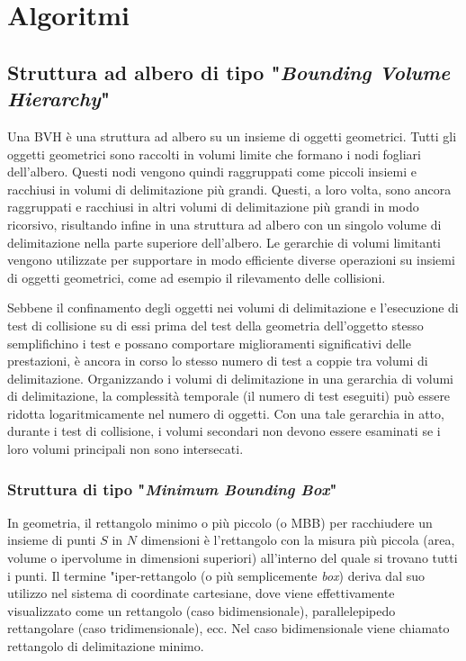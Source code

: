 \chapter{Algoritmi}
\label{Geom_Algos}
%
\section{Struttura ad albero di tipo "\textit{Bounding Volume Hierarchy}"}
%
Una \ac{BVH} è una struttura ad albero su un insieme di oggetti geometrici. Tutti gli oggetti geometrici sono raccolti in volumi limite che formano i nodi fogliari dell'albero. Questi nodi vengono quindi raggruppati come piccoli insiemi e racchiusi in volumi di delimitazione più grandi. Questi, a loro volta, sono ancora raggruppati e racchiusi in altri volumi di delimitazione più grandi in modo ricorsivo, risultando infine in una struttura ad albero con un singolo volume di delimitazione nella parte superiore dell'albero. Le gerarchie di volumi limitanti vengono utilizzate per supportare in modo efficiente diverse operazioni su insiemi di oggetti geometrici, come ad esempio il rilevamento delle collisioni.

Sebbene il confinamento degli oggetti nei volumi di delimitazione e l'esecuzione di test di collisione su di essi prima del test della geometria dell'oggetto stesso semplifichino i test e possano comportare miglioramenti significativi delle prestazioni, è ancora in corso lo stesso numero di test a coppie tra volumi di delimitazione. Organizzando i volumi di delimitazione in una gerarchia di volumi di delimitazione, la complessità temporale (il numero di test eseguiti) può essere ridotta logaritmicamente nel numero di oggetti. Con una tale gerarchia in atto, durante i test di collisione, i volumi secondari non devono essere esaminati se i loro volumi principali non sono intersecati.
%
\subsection{Struttura di tipo "\textit{Minimum Bounding Box}"}
In geometria, il rettangolo minimo o più piccolo (o \ac{MBB}) per racchiudere un insieme di punti $S$ in $N$ dimensioni è l'rettangolo con la misura più piccola (area, volume o ipervolume in dimensioni superiori) all'interno del quale si trovano tutti i punti.  Il termine "iper-rettangolo (o più semplicemente \textit{box}) deriva dal suo utilizzo nel sistema di coordinate cartesiane, dove viene effettivamente visualizzato come un rettangolo (caso bidimensionale), parallelepipedo rettangolare (caso tridimensionale), ecc. Nel caso bidimensionale viene chiamato rettangolo di delimitazione minimo.
%
